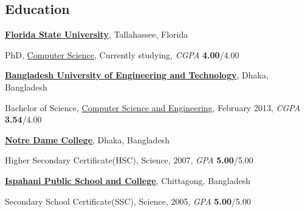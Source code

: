 \documentclass[margin,line]{res}
\newenvironment{list1}{
  \begin{list}{\ding{113}}{%
      \setlength{\itemsep}{0in}
      \setlength{\parsep}{0in} \setlength{\parskip}{0in}
      \setlength{\topsep}{0in} \setlength{\partopsep}{0in} 
      \setlength{\leftmargin}{0.17in}}}{\end{list}}
\begin{document}
\begin{resume}
\vspace*{-.1in}

\section{\sc Education}
{\bf \href{http://www.fsu.edu}{Florida State University}}, Tallahassee, Florida\\
\vspace*{-.15in}
\begin{list1}
\item[] PhD, \href{http://www.cs.fsu.edu/}{Computer Science}, Currently studying, \textit{CGPA} \textbf{4.00}/4.00
\end{list1}
\vspace*{-.15in}
{\bf \href{http://buet.ac.bd}{Bangladesh University of Engineering and Technology}}, Dhaka, Bangladesh\\
\vspace*{-.15in}
\begin{list1}
\item[] Bachelor of Science, \href{http://cse.buet.ac.bd}{Computer Science and Engineering}, February 2013, \textit{CGPA} \textbf{3.54}/4.00
\end{list1}
\vspace*{-.15in}
{\bf \href{http://www.notredamecollege-dhaka.com/}{Notre Dame College}}, Dhaka, Bangladesh\\
\vspace*{-.15in}
\begin{list1}
\item[] Higher Secondary Certificate(HSC), Science, 2007, \textit{GPA} \textbf{5.00}/5.00
\end{list1}
\vspace*{-.15in}
{\bf \href{http://www.ipscctg.edu.bd/}{Ispahani Public School and College}}, Chittagong, Bangladesh\\
\vspace*{-.15in}
\begin{list1}
\item[] Secondary School Certificate(SSC), Science, 2005, \textit{GPA} \textbf{5.00}/5.00
\end{list1}

\vspace*{-.1in}


\end{resume}
\end{document}
